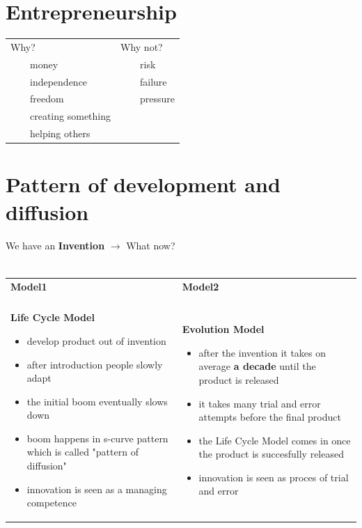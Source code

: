 \documentclass[a4paper]{article}
\newcommand{\tabitem}{~~\llap{\textbullet}~~}
\begin{document}
	\section{Entrepreneurship}
		\begin{tabular}{ll}
			\large Why?&\large Why not?\\
			\tabitem money & \tabitem risk\\
			\tabitem independence & \tabitem failure\\
			\tabitem freedom & \tabitem pressure\\
			\tabitem creating something & \\
			\tabitem helping others & \\
		\end{tabular}
	\section{Pattern of development and diffusion}
		{\LARGE We have an {\bf Invention} $\xrightarrow[]{}$ What now?}\\\\
		\begin{tabular}{ll}
			{\bf\large Model1}&{\bf\large Model2}\\\\
			\begin{minipage}[t]{0.4\textwidth}
				{\bf Life Cycle Model}
				\begin{itemize}
				\setlength{\itemsep}{-3pt}
				\item develop product out of invention
				\item after introduction people slowly adapt
				\item the initial boom eventually slows down
				\item boom happens in s-curve pattern which is called "pattern of diffusion"
				\item innovation is seen as a managing competence
				\end{itemize}
			\end{minipage}
			&
			\begin{minipage}[t]{0.4\textwidth}
				{\bf Evolution Model}
				\begin{itemize}
				\setlength{\itemsep}{-3pt}
				\item after the invention it takes on average {\bf a decade} until the product is 
				released
				\item it takes many trial and error attempts before the final product
				\item the Life Cycle Model comes in once the product is succesfully released
				\item innovation is seen as proces of trial and error
				\end{itemize}
			\end{minipage}
		\end{tabular}\\\\
\end{document}
